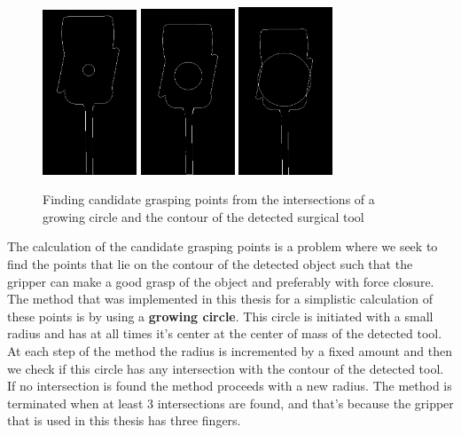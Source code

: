 \begin{center}
\begin{figure}[H]
\centering
\includegraphics[width=0.25\textwidth]{images/grasp_points_1.png}
\includegraphics[width=0.25\textwidth]{images/grasp_points_2.png}
\includegraphics[width=0.25\textwidth]{images/grasp_points_3.png}\\
\caption{Finding candidate grasping points from the intersections of a growing circle and the contour of the detected surgical tool}
\end{figure}
\end{center}

The calculation of the candidate grasping points is a problem where we seek to find the points that lie on the contour of the detected object such that the gripper can make a good grasp of the object and preferably with 
force closure. The method that was implemented in this thesis for a simplistic calculation of these points is by using a \textbf{growing circle}. This circle is initiated with a small radius and has at all times it's center at the 
center of mass of the detected tool. At each step of the method the radius is incremented by a fixed amount and then we check if this circle has any intersection with the contour of the detected tool. If no intersection 
is found the method proceeds with a new radius. The method is terminated when at least 3 intersections are found, and that's because the gripper that is used in this thesis has three fingers.


